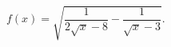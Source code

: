 \begin{ex}[type=inequality]
	\begin{condition}
		$f(x) = \sqrt{\dfrac{1}{2\sqrt{x} - 8} - \dfrac{1}{\sqrt{x} - 3}}.$
	\end{condition}
\end{ex}